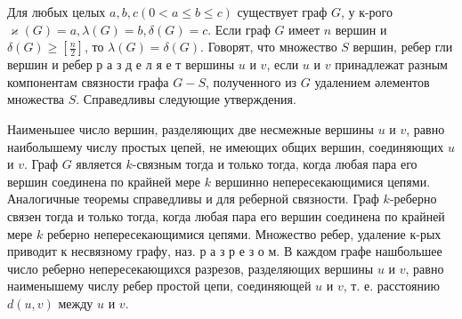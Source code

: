 \documentclass[10pt]{article}
\begin{document}
Для любых целых $a, b, c(0<a \leqslant b \leqslant c)$ существует граф $G$, у к-рого $\varkappa(G)=a, \lambda(G)=b, \delta(G)=c$. Если граф $G$ имеет $n$ вершин и $\delta(G) \geqslant\left[\frac{n}{2}\right]$, то $\lambda(G)=\delta(G)$. Говорят, что множество $S$ вершин, ребер гли вершин и ребер р а з д е л я е т вершины $u$ и $v$, если $u$ и $v$ принадлежат разным компонентам связности графа $G-S$, полученного из $G$ удалением әлементов множества $S$. Справедливы следующие утверждения.



Наименьшее число вершин, разделяющих две несмежные вершины $u$ и $v$, равно наиболышему числу простых цепей, не имеющих общих вершин, соединяющих $u$ и $v$. Граф $G$ является $k$-связным тогда и только тогда, когда любая пара его вершин соединена по крайней мере $k$ вершинно непересекающимися цепями. Аналогичные теоремы справедливы и для реберной связности. Граф $k$-реберно связен тогда и только тогда, когда любая пара его вершин соединена по крайней мере $k$ реберно непересекающимися цепями. Множество ребер, удаление к-рых приводит к несвязному графу, наз. р а з р е з о м. В каждом графе нашбольшее число реберно непересекающихся разрезов, разделяющих вершины $u$ и $v$, равно наименышему числу ребер простой цепи, соединяющей $u$ и $v$, т. е. расстоянию $d(u, v)$ между $u$ и $v$.
\end{document}
